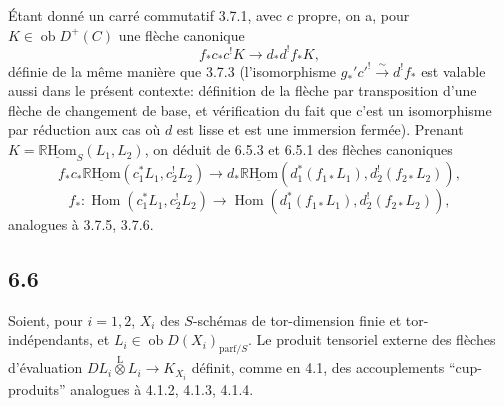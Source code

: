 \documentclass[11pt]{article}
\DeclareMathOperator{\Hom}{Hom}
\newcommand{\R}{\mathbb{R}}\newcommand{\RHomCore}{\mathbb{R}\mathrm{Hom}}
\providecommand{\RHom}{\RHomCore}
\providecommand{\uRHom}{\underline{\RHom}}
\providecommand{\RHom}{\RHomCore}
\providecommand{\Hom}{\operatorname{Hom}}
\providecommand{\RHom}{\R\mathcal{H}om}
\providecommand{\R}{\mathrm R}
\providecommand{\RHom}{\RHomCore}
\providecommand{\Hom}{\operatorname{Hom}}
\begin{document}
Étant donné un carré commutatif 3.7.1, avec $c$ propre, on a, pour $K\in\operatorname{ob}D^+(C)$ une flèche canonique
\begin{equation}
\tag{6.5.3}
f_*c_*c^!K\longrightarrow d_*d^!f_*K,
\end{equation}
définie de la même manière que 3.7.3 (l'isomorphisme $g_*'c'^!\xrightarrow{\sim}d^!f_*$ est valable aussi dans le présent contexte: définition de la flèche par transposition d'une flèche de changement de base, et vérification du fait que c'est un isomorphisme par réduction aux cas où $d$ est lisse et est une immersion fermée). Prenant $K=\uRHom_S(L_1,L_2)$, on déduit de 6.5.3 et 6.5.1 des flèches canoniques
\begin{equation}
\tag{6.5.4}
f_*c_*\uRHom(c_1^*L_1,c_2^!L_2)\longrightarrow d_*\uRHom(d_1^*(f_{1*}L_1),d_2^!(f_{2*}L_2)),
\end{equation}
\begin{equation}
\tag{6.5.5}
f_*:\Hom(c_1^*L_1,c_2^!L_2)\longrightarrow\Hom(d_1^*(f_{1*}L_1),d_2^!(f_{2*}L_2)),
\end{equation}
analogues à 3.7.5, 3.7.6.

\subsection*{6.6}
Soient, pour $i=1,2$, $X_i$ des $S$-schémas de tor-dimension finie et tor-indépendants, et $L_i\in\operatorname{ob}D(X_i)_{\mathrm{parf}/S}$. Le produit tensoriel externe des flèches d'évaluation $DL_i\overset{\mathrm{L}}{\otimes}L_i\to K_{X_i}$ définit, comme en 4.1, des accouplements ``cup-produits'' analogues à 4.1.2, 4.1.3, 4.1.4.
\end{document}

